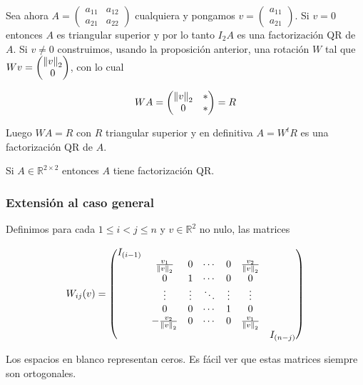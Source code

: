 Sea ahora $A = \begin{pmatrix}
a_{11} & a_{12}\\
a_{21} & a_{22}
\end{pmatrix}$ cualquiera y pongamos $v = \begin{pmatrix}a_{11} \\ a_{21}\end{pmatrix}$. Si $v = 0$ entonces $A$ es triangular superior y por lo tanto $I_2 A$ es una factorización QR de $A$. Si $v \neq 0$ construimos, usando la proposición anterior, una rotación $W$ tal que $Wv = \begin{pmatrix}\left\lVert v\right\rVert_2 \\ 0\end{pmatrix}$, con lo cual

\[WA = \begin{pmatrix}
\left\lVert v\right\rVert_2 & * \\
0 & *
\end{pmatrix} = R\]

Luego $WA = R$ con $R$ triangular superior y en definitiva $A = W^tR$ es una factorización QR de $A$.

\begin{propo}
Si $A \in \mathbb{R}^{2 \times 2}$ entonces $A$ tiene factorización QR.
\end{propo}

\subsubsection{Extensión al caso general}
Definimos para cada $1 \leq i < j \leq n$ y $v \in \mathbb{R}^2$ no nulo, las matrices

\[W_{ij}(v) = \begin{pmatrix}
I_{(i-1)}	&												&			&															& \\
		& \frac{v_1}{\left\lVert v\right\rVert_2}	& 0 			& \cdots & 0 & \frac{v_2}{\left\lVert v\right\rVert_2} 	& \\
		& 0												& 1 			& \cdots & 0 & 0												& \\
		& \vdots											& \vdots 	& \ddots & \vdots & \vdots										& \\
		& 0												& 0			& \cdots & 1 & 0												& \\
		& -\frac{v_2}{\left\lVert v\right\rVert_2}	& 0			& \cdots	 & 0 & \frac{v_1}{\left\lVert v\right\rVert_2}	& \\
		&												&			&		 &	 &												& I_{(n - j)}
\end{pmatrix}\]

Los espacios en blanco representan ceros. Es fácil ver que estas matrices siempre son ortogonales.

